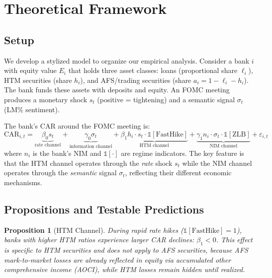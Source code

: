 \documentclass[12pt,a4paper]{article}
\newtheorem{proposition}{Proposition}
\begin{document}
\section{Theoretical Framework}\label{sec:theory}

\subsection{Setup}

We develop a stylized model to organize our empirical analysis. Consider a bank $i$ with equity value $E_i$ that holds three asset classes: loans (proportional share $\ell_i$), HTM securities (share $h_i$), and AFS/trading securities (share $a_i = 1 - \ell_i - h_i$). The bank funds these assets with deposits and equity. An FOMC meeting produces a monetary shock $s_t$ (positive = tightening) and a semantic signal $\sigma_t$ (LM\% sentiment).

The bank's CAR around the FOMC meeting is:
\begin{equation}\label{eq:car}
\text{CAR}_{i,t} = \underbrace{\beta_0 s_t}_{\text{rate channel}} + \underbrace{\gamma_0 \sigma_t}_{\text{information channel}} + \underbrace{\beta_1 h_i \cdot s_t \cdot \mathbb{1}[\text{FastHike}]}_{\text{HTM channel}} + \underbrace{\gamma_1 n_i \cdot \sigma_t \cdot \mathbb{1}[\text{ZLB}]}_{\text{NIM channel}} + \varepsilon_{i,t}
\end{equation}
where $n_i$ is the bank's NIM and $\mathbb{1}[\cdot]$ are regime indicators. The key feature is that the HTM channel operates through the \textit{rate} shock $s_t$ while the NIM channel operates through the \textit{semantic} signal $\sigma_t$, reflecting their different economic mechanisms.

\subsection{Propositions and Testable Predictions}

\begin{proposition}[HTM Channel]\label{prop:htm}
During rapid rate hikes ($\mathbb{1}[\text{FastHike}] = 1$), banks with higher HTM ratios experience larger CAR declines: $\beta_1 < 0$. This effect is specific to HTM securities and does not apply to AFS securities, because AFS mark-to-market losses are already reflected in equity via accumulated other comprehensive income (AOCI), while HTM losses remain hidden until realized.
\end{proposition}
\end{document}
